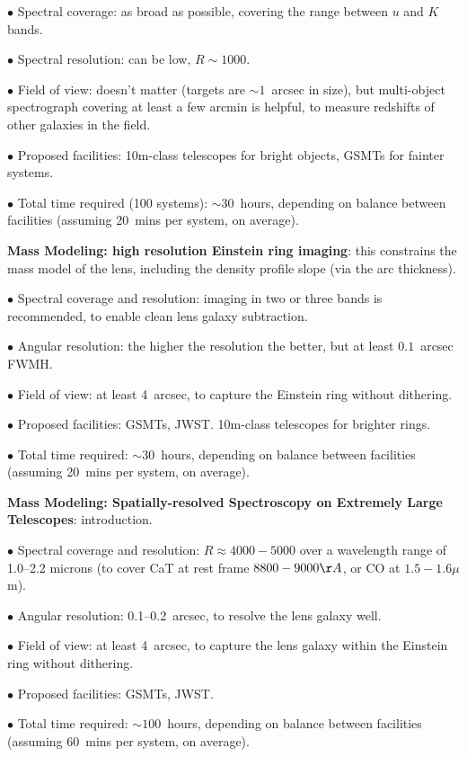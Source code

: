 $\bullet$ Spectral coverage: as broad as possible, covering the range
between $u$ and $K$ bands.

$\bullet$ Spectral resolution: can be low, $R\sim1000$.

$\bullet$ Field of view: doesn't matter (targets are $\sim1$~arcsec in size),
but multi-object spectrograph covering at least a few arcmin is helpful,
to measure redshifts of other galaxies in the field.

$\bullet$ Proposed facilities: 10m-class telescopes for bright objects,
GSMTs for fainter systems.

$\bullet$ Total time required (100 systems): $\sim30$~hours, depending
on balance between facilities (assuming 20~mins per system, on average).



{\bf Mass Modeling: high resolution Einstein ring imaging}: this
constrains the mass model of the lens, including the density profile
slope (via the arc thickness).

$\bullet$ Spectral coverage and resolution: imaging in two or three bands is
recommended, to enable clean lens galaxy subtraction.

$\bullet$ Angular resolution: the higher the resolution the better, but
at least $0.1$~arcsec FWMH.

$\bullet$ Field of view: at least 4~arcsec, to capture the Einstein
ring without dithering.

$\bullet$ Proposed facilities: GSMTs, JWST. 10m-class telescopes for
brighter rings.

$\bullet$ Total time required: $\sim30$~hours, depending
on balance between facilities (assuming 20~mins per system, on average).


{\bf Mass Modeling: Spatially-resolved
Spectroscopy on Extremely Large Telescopes}: introduction.

$\bullet$ Spectral coverage and resolution: $R\approx4000-5000$  over a
wavelength range of 1.0--2.2 microns (to cover CaT at rest frame
$8800-9000\AA$, or CO at $1.5-1.6\mu$m).

$\bullet$ Angular resolution: 0.1--0.2~arcsec, to resolve the lens galaxy well.

$\bullet$ Field of view: at least 4~arcsec, to capture the lens galaxy
within the Einstein ring without dithering.

$\bullet$ Proposed facilities: GSMTs, JWST.

$\bullet$ Total time required: $\sim100$~hours, depending
on balance between facilities (assuming 60~mins per system, on average).


